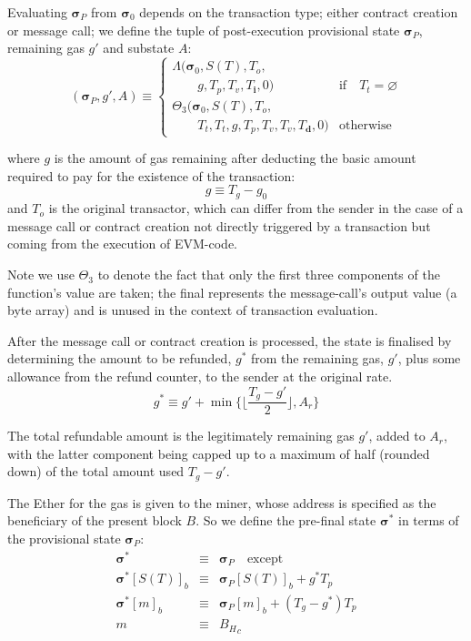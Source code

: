 \documentclass[9pt,oneside]{amsart}
\begin{document}
\begin{multicols}{2}
Evaluating $\boldsymbol{\sigma}_P$ from $\boldsymbol{\sigma}_0$ depends on the transaction type; either contract creation or message call; we define the tuple of post-execution provisional state $\boldsymbol{\sigma}_P$, remaining gas $g'$ and substate $A$:
\begin{equation}
(\boldsymbol{\sigma}_P, g', A) \equiv \begin{cases}
\Lambda(\boldsymbol{\sigma}_0, S(T), T_o, &\\ \quad\quad g, T_p, T_v, T_\mathbf{i}, 0) & \text{if} \quad T_t = \varnothing \\
\Theta_{3}(\boldsymbol{\sigma}_0, S(T), T_o, &\\ \quad\quad T_t, T_t, g, T_p, T_v, T_v, T_\mathbf{d}, 0) & \text{otherwise}
\end{cases}
\end{equation}

where $g$ is the amount of gas remaining after deducting the basic amount required to pay for the existence of the transaction:
\begin{equation}
g \equiv T_g - g_0
\end{equation}
and $T_o$ is the original transactor, which can differ from the sender in the case of a message call or contract creation not directly triggered by a transaction but coming from the execution of EVM-code.

Note we use $\Theta_{3}$ to denote the fact that only the first three components of the function's value are taken; the final represents the message-call's output value (a byte array) and is unused in the context of transaction evaluation.

After the message call or contract creation is processed, the state is finalised by determining the amount to be refunded, $g^*$ from the remaining gas, $g'$, plus some allowance from the refund counter, to the sender at the original rate.
\begin{equation}
g^* \equiv g' + \min \{ \Big\lfloor \dfrac{T_g - g'}{2} \Big\rfloor, A_r \}
\end{equation}

The total refundable amount is the legitimately remaining gas $g'$, added to $A_r$, with the latter component being capped up to a maximum of half (rounded down) of the total amount used $T_g - g'$.

The Ether for the gas is given to the miner, whose address is specified as the beneficiary of the present block $B$. So we define the pre-final state $\boldsymbol{\sigma}^*$ in terms of the provisional state $\boldsymbol{\sigma}_P$:
\begin{eqnarray}
\boldsymbol{\sigma}^* & \equiv & \boldsymbol{\sigma}_P \quad \text{except} \\
\boldsymbol{\sigma}^*[S(T)]_b & \equiv & \boldsymbol{\sigma}_P[S(T)]_b + g^* T_p \\
\boldsymbol{\sigma}^*[m]_b & \equiv & \boldsymbol{\sigma}_P[m]_b + (T_g - g^*) T_p \\
m & \equiv & {B_H}_c
\end{eqnarray}


\end{multicols}
\end{document}
